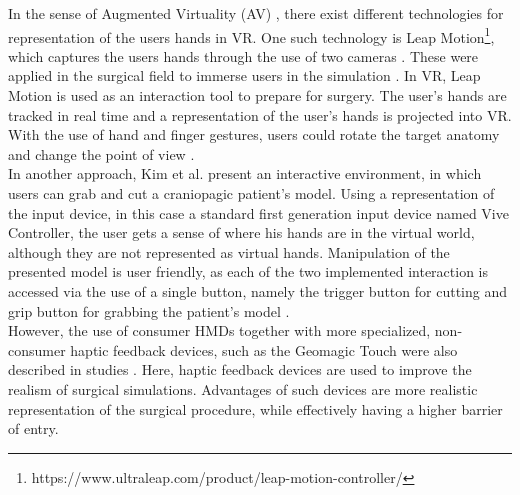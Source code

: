 In the sense of Augmented Virtuality (AV) \cite{milgram1994taxonomy}, there exist different technologies for representation of the users hands in VR.
One such technology is Leap Motion\footnote{https://www.ultraleap.com/product/leap-motion-controller/}, which captures the users hands through the use of two cameras \cite{LeapMotion}.
These were applied in the surgical field to immerse users in the simulation \cite{VenkataS.Arikatla.2018,Sampogna.2017}.
In VR, Leap Motion is used as an interaction tool to prepare for surgery.
The user's hands are tracked in real time and a representation of the user's hands is projected into VR.
With the use of hand and finger gestures, users could rotate the target anatomy and change the point of view \cite{Sampogna.2017}.
\\ In another approach, Kim et al. \cite{kim2017virtual} present an interactive environment, in which users can grab and cut a craniopagic patient's model.
Using a representation of the input device, in this case a standard first generation input device named Vive Controller, the user gets a sense of where 
his hands are in the virtual world, although they are not represented as virtual hands. 
Manipulation of the presented model is user friendly, as each of the two implemented interaction is accessed via the use of a single button, namely the 
trigger button for cutting and grip button for grabbing the patient's model \cite{.2017}.
\\ However, the use of consumer HMDs together with more specialized, non-consumer haptic feedback devices, such as the Geomagic Touch were also described in studies \cite{VenkataS.Arikatla.2018}.
Here, haptic feedback devices are used to improve the realism of surgical simulations.
Advantages of such devices are more realistic representation of the surgical procedure, while effectively having a higher barrier of entry.
